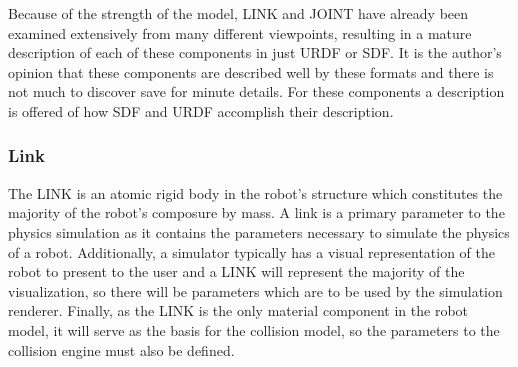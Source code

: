 Because of the strength of the model, LINK and JOINT have already been examined extensively from many different viewpoints, resulting in a mature description of each of these components in just URDF or SDF. It is the author's opinion that these components are described well by these formats and there is not much to discover save for minute details. For these components a description is offered of how SDF and URDF accomplish their description.

\subsubsection{Link}
The LINK is an atomic rigid body in the robot's structure which constitutes the majority of the robot's composure by mass. A link is a primary parameter to the physics simulation as it contains the parameters necessary to simulate the physics of a robot. Additionally, a simulator typically has a visual representation of the robot to present to the user and a LINK will represent the majority of the visualization, so there will be parameters which are to be used by the simulation renderer. Finally, as the LINK is the only material component in the robot model, it will serve as the basis for the collision model, so the parameters to the collision engine must also be defined.

